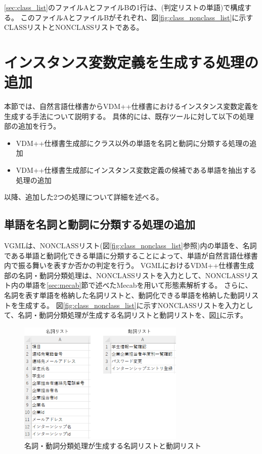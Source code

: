 \ref{sec:class_list}のファイルAとファイルBの1行は、(判定リストの単語)で構成する。
このファイルAとファイルBがそれぞれ、図\ref{fig:class_nonclass_list}に示すCLASSリストとNONCLASSリストである。

\section{インスタンス変数定義を生成する処理の追加}
\label{sec:instance_generate}
本節では、自然言語仕様書からVDM++仕様書におけるインスタンス変数定義を生成する手法について説明する。
具体的には、既存ツールに対して以下の処理部の追加を行う。

\begin{itemize}
    \item VDM++仕様書生成部にクラス以外の単語を名詞と動詞に分類する処理の追加
    \item VDM++仕様書生成部にインスタンス変数定義の候補である単語を抽出する処理の追加
\end{itemize}

以降、追加した2つの処理について詳細を述べる。

\subsection{単語を名詞と動詞に分類する処理の追加}
\label{sec:classifier_meishi}
VGMLは、NONCLASSリスト(図\ref{fig:class_nonclass_list}参照)内の単語を、名詞である単語と動詞化できる単語に分類することによって、単語が自然言語仕様書内で振る舞いを表すか否かの判定を行う。
VGMLにおけるVDM++仕様書生成部の名詞・動詞分類処理は、NONCLASSリストを入力として、NONCLASSリスト内の単語を\ref{sec:mecab}節で述べたMecabを用いて形態素解析する。
さらに、名詞を表す単語を格納した名詞リストと、動詞化できる単語を格納した動詞リストを生成する。
図\ref{fig:class_nonclass_list}に示すNONCLASSリストを入力として、名詞・動詞分類処理が生成する名詞リストと動詞リストを、図\ref{fig:meishi_doshi_list}に示す。

\begin{figure}[t]
    \begin{center}
        \includegraphics[width=300]{image/meishi_doshi_list.png}
        \caption{名詞・動詞分類処理が生成する名詞リストと動詞リスト}
        \label{fig:meishi_doshi_list}
    \end{center}
\end{figure}

